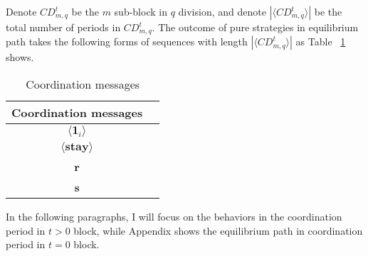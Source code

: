 \documentclass[12pt,letter]{article}
\theoremstyle{definition}
\theoremstyle{remark}
\theoremstyle{claim}
\begin{document}
Denote $CD^t_{m,q}$ be the $m$ sub-block in $q$ division, and denote $|\langle CD^t_{m,q} \rangle|$ be the total number of periods in $CD^t_{m,q}$.  The outcome of pure strategies in equilibrium path takes the following forms of sequences with length $|\langle CD^t_{m,q} \rangle|$ as Table ~\ref{Table_msg_coordination} shows.
\begin{table}[ht]
\caption{Coordination messages}
\label{Table_msg_coordination}
\begin{center}

\begin{tabular}{cc }
Coordination messages		&   \\
\hline
$\langle \mathbf{1}_i \rangle$ 	& 	 \\
$\langle \textbf{stay} \rangle$	&   \\
\textbf{r}									& 	\\
\textbf{s}									& 	\\
\end{tabular}
\end{center}
\end{table}

In the following paragraphs, I will focus on the behaviors in the coordination period in $t>0$ block, while Appendix shows the equilibrium path in coordination period in $t=0$ block. 
\end{document}
